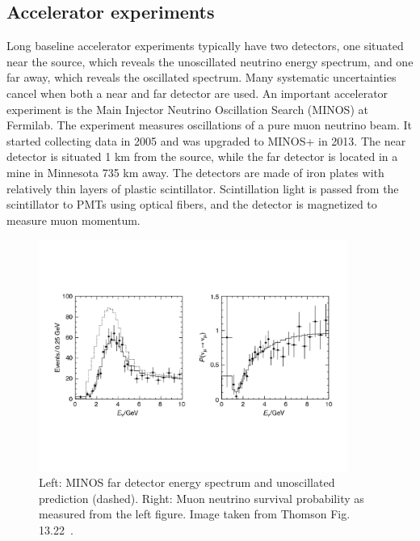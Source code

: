 \subsection{Accelerator experiments}
Long baseline accelerator experiments typically have two detectors, one
situated near the source, which reveals the unoscillated neutrino energy
spectrum, and one far away, which reveals the oscillated spectrum.
Many systematic uncertainties cancel when both a near and far detector are
used.
An important accelerator experiment is the Main Injector Neutrino Oscillation
Search (MINOS) at Fermilab. The experiment measures oscillations
of a pure muon neutrino beam. It started collecting data in 2005 and
was upgraded to MINOS+ in 2013. The near detector is situated 1 km
from the source, while the far detector is located in a mine in Minnesota
735 km away. The detectors are made of iron plates with relatively
thin layers of
plastic scintillator. Scintillation light is passed from the scintillator to
PMTs using optical fibers, and the detector is magnetized to measure
muon momentum.

\begin{figure}
  \centering
  \includegraphics[width=0.90\textwidth,height=0.90\textheight,keepaspectratio]
                {pictures/t13_22.pdf}
  \vspace*{-20mm}
  \caption{Left: MINOS far detector energy spectrum and unoscillated
           prediction (dashed). Right: Muon neutrino survival probability
           as measured from the left figure. Image taken from Thomson
           Fig. 13.22~\cite{thomson_modern_2013}.}
  \label{fig:minos}
\end{figure}


